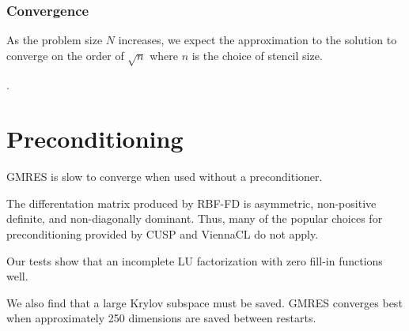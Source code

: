 \subsubsection{Convergence}

As the problem size $N$ increases, we expect the approximation to the solution to converge on the order of $\sqrt{n}$ where $n$ is the choice of stencil size. %

. 




\section{Preconditioning} 

GMRES is slow to converge when used without a preconditioner. 

The differentation matrix produced by RBF-FD is asymmetric, non-positive definite, and non-diagonally dominant. Thus, many of the popular choices for preconditioning provided by CUSP and ViennaCL do not apply. 

Our tests show that an incomplete LU factorization with zero fill-in \cite{Saad2003} functions well. 

We also find that a large Krylov subspace must be saved. GMRES converges best when approximately 250 dimensions are saved between restarts. 







